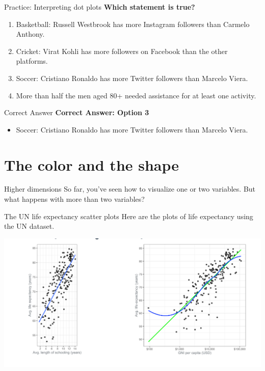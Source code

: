 \documentclass[
  ignorenonframetext,
]{beamer}
\providecommand{\tightlist}{%
  \setlength{\itemsep}{0pt}\setlength{\parskip}{0pt}}
\begin{document}
\begin{frame}{Practice: Interpreting dot plots}
\label{practice-interpreting-dot-plots-2}
\textbf{Which statement is true?}

\begin{enumerate}
\tightlist
\item
  Basketball: Russell Westbrook has more Instagram followers than
  Carmelo Anthony.
\item
  Cricket: Virat Kohli has more followers on Facebook than the other
  platforms.
\item
  Soccer: Cristiano Ronaldo has more Twitter followers than Marcelo
  Viera.
\item
  More than half the men aged 80+ needed assistance for at least one
  activity.
\end{enumerate}
\end{frame}

\begin{frame}{Correct Answer}
\label{correct-answer-1}
\textbf{Correct Answer: Option 3}

\begin{itemize}
\tightlist
\item
  Soccer: Cristiano Ronaldo has more Twitter followers than Marcelo
  Viera.
\end{itemize}
\end{frame}

\section{The color and the shape}\label{the-color-and-the-shape}

\begin{frame}{Higher dimensions}
\label{higher-dimensions}
So far, you've seen how to visualize one or two variables. But what
happens with more than two variables?
\end{frame}

\begin{frame}{The UN life expectancy scatter plots}
\label{the-un-life-expectancy-scatter-plots}
Here are the plots of life expectancy using the UN dataset.

\includegraphics{../images/im64.png}
\end{frame}
\end{document}
